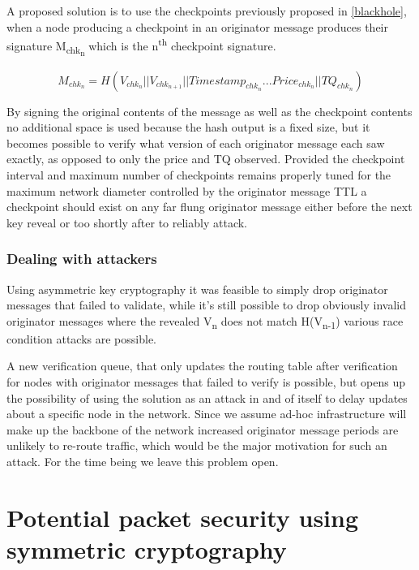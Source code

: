 \documentclass[11pt]{article}
\begin{document}
                        A proposed solution is to use the checkpoints previously proposed in \ref{blackhole}, when a node producing a checkpoint in an originator message produces their signature M\textsubscript{chk\textsubscript{n}} which is the n\textsuperscript{th} checkpoint signature.
                        
                        \[M_{chk_n} = H(V_{chk_n}||V_{chk_{n+1}}||Timestamp_{chk_n}...Price_{chk_n}||TQ_{chk_n})\]
                        
                        By signing the original contents of the message as well as the checkpoint contents no additional space is used because the hash output is a fixed size, but it becomes possible to verify what version of each originator message each saw exactly, as opposed to only the price and TQ observed. Provided the checkpoint interval and maximum number of checkpoints remains properly tuned for the maximum network diameter controlled by the originator message TTL a checkpoint should exist on any far flung originator message either before the next key reveal or too shortly after to reliably attack.
                                                
               \subsubsection{Dealing with attackers}
               
                      Using asymmetric key cryptography it was feasible to simply drop originator messages that failed to validate, while it's still possible to drop obviously invalid originator messages where the revealed V\textsubscript{n} does not match H(V\textsubscript{n-1}) various race condition attacks are possible. 
                          
                      A new verification queue, that only updates the routing table after verification for nodes with originator messages that failed to verify is possible, but opens up the possibility of using the solution as an attack in and of itself to delay updates about a specific node in the network. Since we assume ad-hoc infrastructure will make up the backbone of the network increased originator message periods are unlikely to re-route traffic, which would be the major motivation for such an attack. For the time being we leave this problem open.
                      
                      
\section {Potential packet security using symmetric cryptography}
\end{document}

